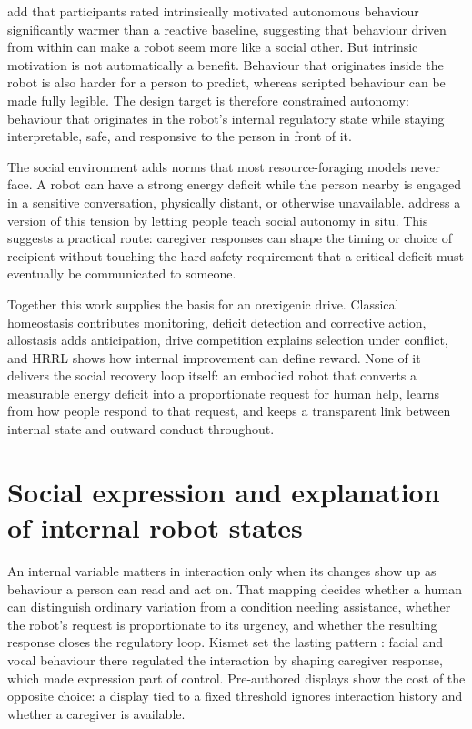 \citet{Scheunemann2022IntrinsicallyMotivated} add that participants rated intrinsically motivated autonomous behaviour significantly warmer than a reactive baseline, suggesting that behaviour driven from within can make a robot seem more like a social other. But intrinsic motivation is not automatically a benefit. Behaviour that originates inside the robot is also harder for a person to predict, whereas scripted behaviour can be made fully legible. The design target is therefore constrained autonomy: behaviour that originates in the robot's internal regulatory state while staying interpretable, safe, and responsive to the person in front of it.

The social environment adds norms that most resource-foraging models never face. A robot can have a strong energy deficit while the person nearby is engaged in a sensitive conversation, physically distant, or otherwise unavailable. \citet{Senft2019SocialAutonomy} address a version of this tension by letting people teach social autonomy in situ. This suggests a practical route: caregiver responses can shape the timing or choice of recipient without touching the hard safety requirement that a critical deficit must eventually be communicated to someone.

Together this work supplies the basis for an orexigenic drive. Classical homeostasis contributes monitoring, deficit detection and corrective action, allostasis adds anticipation, drive competition explains selection under conflict, and HRRL shows how internal improvement can define reward. None of it delivers the social recovery loop itself: an embodied robot that converts a measurable energy deficit into a proportionate request for human help, learns from how people respond to that request, and keeps a transparent link between internal state and outward conduct throughout.

\section{Social expression and explanation of internal robot states}
\label{sec:soa-expression}

An internal variable matters in interaction only when its changes show up as behaviour a person can read and act on. That mapping decides whether a human can distinguish ordinary variation from a condition needing assistance, whether the robot's request is proportionate to its urgency, and whether the resulting response closes the regulatory loop. Kismet set the lasting pattern \citep{Breazeal2003Emotion}: facial and vocal behaviour there regulated the interaction by shaping caregiver response, which made expression part of control. Pre-authored displays \citep{Cao2017CollaborativeHomeostatic,Cao2017EndUserHomeostatic} show the cost of the opposite choice: a display tied to a fixed threshold ignores interaction history and whether a caregiver is available.

